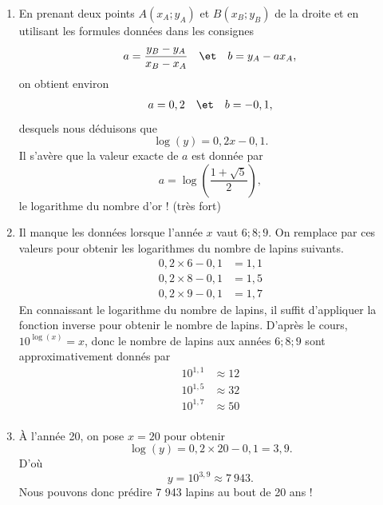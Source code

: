 {\begin{enumerate}
\begin{center}
		\end{center}
		\item 
		En prenant deux points $A(x_A;y_A)$ et $B(x_B ; y_B)$ de la droite et en utilisant les formules données dans les consignes
		\begin{align*}
			a = \dfrac{y_B-y_A}{x_B-x_A} && \et && b =y_A - ax_A,
		\end{align*}
		on obtient environ
		\begin{align*}
			a = 0,2 && \et && b =-0,1,
		\end{align*}
		desquels nous déduisons que
			\[ \log(y) = 0,2x - 0,1. \]
		Il s'avère que la valeur exacte de $a$ est donnée par
			\[ a = \log\left(\dfrac{1+\sqrt5}2\right), \]
		le logarithme du nombre d'or ! (très fort)
		\item
		Il manque les données lorsque l'année $x$ vaut $6 ; 8 ; 9$. On remplace par ces valeurs pour obtenir les logarithmes du nombre de lapins suivants.
		\begin{align*}
			0,2\times6 - 0,1 &= 1,1 \\
			0,2\times8 - 0,1 &= 1,5 \\
			0,2\times9 - 0,1 &= 1,7
		\end{align*}
		En connaissant le logarithme du nombre de lapins, il suffit d'appliquer la fonction inverse pour obtenir le nombre de lapins.
		D'après le cours, $10^{\log(x)} = x$, donc le nombre de lapins aux années $6 ; 8 ; 9$ sont approximativement donnés par
		\begin{align*}
			10^{1,1} &\approx 12 \\
			10^{1,5} &\approx 32 \\
			10^{1,7} &\approx 50 \\
		\end{align*}
		\item
		À l'année 20, on pose $x=20$ pour obtenir
			\[ \log(y) = 0,2\times20-0,1 = 3,9. \]
		D'où
			\[ y = 10^{3,9} \approx 7~943. \]
		Nous pouvons donc prédire 7 943 lapins au bout de 20 ans !
	\end{enumerate}
		
		
}




\label{lastpage}
\newpage
{}
\shipoutAnswer


